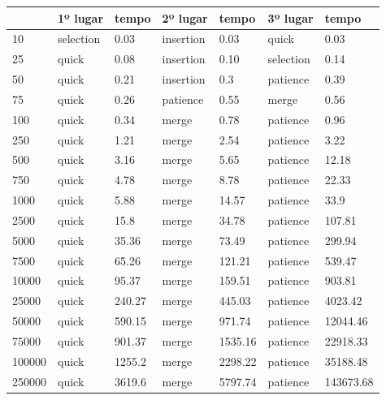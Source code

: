 \documentclass[a4paper,12pt]{scrartcl}
\begin{document}
\begin{table}[]
\begin{tabular}{|l|l|l|l|l|l|l|}
\hline
\textbf{} & 1º lugar & tempo     & 2º lugar & tempo     & 3º lugar & tempo     \\ \hline
10        & selection & 0.03      & insertion & 0.03      & quick     & 0.03      \\ \hline
25        & quick     & 0.08      & insertion & 0.10      & selection & 0.14      \\ \hline
50        & quick     & 0.21      & insertion & 0.3       & patience  & 0.39      \\ \hline
75        & quick     & 0.26      & patience  & 0.55      & merge     & 0.56      \\ \hline
100       & quick     & 0.34      & merge     & 0.78      & patience  & 0.96      \\ \hline
250       & quick     & 1.21      & merge     & 2.54      & patience  & 3.22      \\ \hline
500       & quick     & 3.16      & merge     & 5.65      & patience  & 12.18     \\ \hline
750       & quick     & 4.78      & merge     & 8.78      & patience  & 22.33     \\ \hline
1000      & quick     & 5.88      & merge     & 14.57     & patience  & 33.9      \\ \hline
2500      & quick     & 15.8      & merge     & 34.78     & patience  & 107.81    \\ \hline
5000      & quick     & 35.36     & merge     & 73.49     & patience  & 299.94    \\ \hline
7500      & quick     & 65.26     & merge     & 121.21    & patience  & 539.47    \\ \hline
10000     & quick     & 95.37     & merge     & 159.51    & patience  & 903.81    \\ \hline
25000     & quick     & 240.27    & merge     & 445.03    & patience  & 4023.42   \\ \hline
50000     & quick     & 590.15    & merge     & 971.74    & patience  & 12044.46  \\ \hline
75000     & quick     & 901.37    & merge     & 1535.16   & patience  & 22918.33  \\ \hline
100000    & quick     & 1255.2    & merge     & 2298.22   & patience  & 35188.48  \\ \hline
250000    & quick     & 3619.6    & merge     & 5797.74   & patience  & 143673.68 \\ \hline

\end{tabular}
\end{table}
\end{document}
